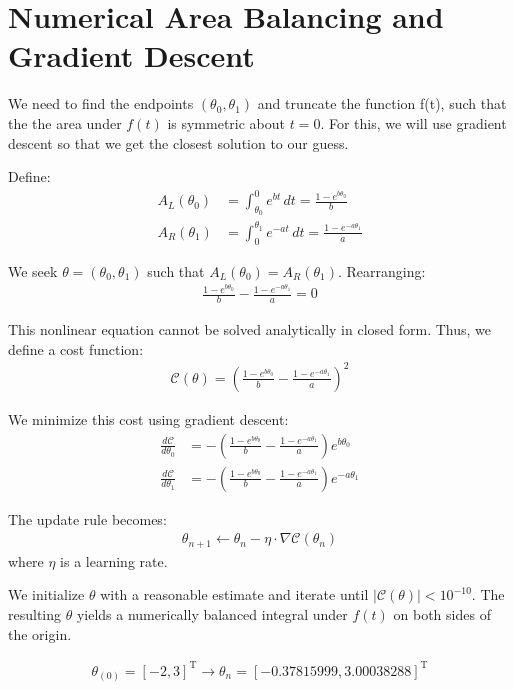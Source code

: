 \documentclass[conference]{IEEEtran}
\theoremstyle{remark}
\begin{document}
	\section{Numerical Area Balancing and Gradient Descent}
	We need to find the endpoints $(\theta_0, \theta_1)$ and truncate the function f(t), such that the the area under $f(t)$ is symmetric about $t=0$. For this, we will use gradient descent so that we get the closest solution to our guess.
	
	Define:
	\begin{align}
		A_L(\theta_0) &= \int_{\theta_0}^{0} e^{bt} \, dt = \frac{1 - e^{b\theta_0}}{b} \\
		A_R(\theta_1) &= \int_{0}^{\theta_1} e^{-at} \, dt = \frac{1 - e^{-a\theta_1}}{a}
	\end{align}
	
	We seek $\theta = (\theta_0, \theta_1)$ such that $A_L(\theta_0) = A_R(\theta_1)$. Rearranging:
	\begin{align}
		\frac{1 - e^{b\theta_0}}{b} - \frac{1 - e^{-a\theta_1}}{a} = 0
	\end{align}
	
	This nonlinear equation cannot be solved analytically in closed form. Thus, we define a cost function:
	\begin{align}
		\mathcal{C}(\theta) =\left(  \frac{1 - e^{b\theta_0}}{b} - \frac{1 - e^{-a\theta_1}}{a} \right) ^ 2
	\end{align}
	
	We minimize this cost using gradient descent:
	\begin{align}
		\frac{d\mathcal{C}}{d\theta_0} &= -\left(  \frac{1 - e^{b\theta_0}}{b} - \frac{1 - e^{-a\theta_1}}{a} \right) e^{b\theta_0} \\
		\frac{d\mathcal{C}}{d\theta_1} &= -\left(  \frac{1 - e^{b\theta_0}}{b} - \frac{1 - e^{-a\theta_1}}{a} \right) e^{-a\theta_1}
	\end{align}
	
	The update rule becomes:
	\begin{align}
		\theta_{n+1} \leftarrow \theta_{n} - \eta \cdot \nabla \mathcal{C}(\theta_n)
	\end{align}
	where $\eta$ is a learning rate.
	
	We initialize $\theta$ with a reasonable estimate and iterate until $|\mathcal{C}(\theta)| < 10^{-10}$. The resulting $\theta$ yields a numerically balanced integral under $f(t)$ on both sides of the origin.
	
	\begin{align}
		\theta_{(0)} = [-2, 3]^\text{T} \rightarrow \theta_{n} = [-0.37815999 , 3.00038288]^\text{T}
	\end{align}
	
\end{document}
